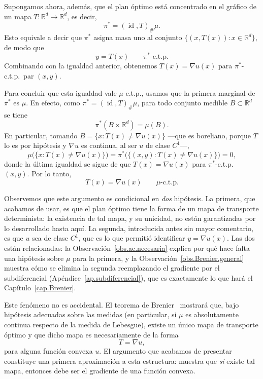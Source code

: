 \documentclass[12pt, a4paper]{amsbook}
\theoremstyle{remark}
\theoremstyle{definition}
\numberwithin{section}{chapter}
\numberwithin{subsection}{section}
\numberwithin{equation}{section}
\numberwithin{figure}{chapter}
\begin{document}
Supongamos ahora, además, que el plan óptimo está concentrado en el gráfico de un mapa $T\colon\mathbb{R}^d\to\mathbb{R}^d$, es decir,
\[
\pi^*=(\operatorname{id},T)_\#\mu.
\]
Esto equivale a decir que $\pi^*$ asigna masa uno al conjunto $\{(x,T(x)):x\in\mathbb{R}^d\}$, de modo que
\[
y=T(x)
\qquad
\pi^*\text{-c.t.p.}
\]
Combinando con la igualdad anterior, obtenemos $T(x)=\nabla u(x)$ para $\pi^*$-c.t.p.\ par $(x,y)$.

Para concluir que esta igualdad vale $\mu$-c.t.p., usamos que la primera marginal de $\pi^*$ es $\mu$. En efecto, como $\pi^*=(\operatorname{id},T)_\#\mu$, para todo conjunto medible $B\subset\mathbb{R}^d$ se tiene
\[
\pi^*(B\times\mathbb{R}^d)=\mu(B).
\]
En particular, tomando $B=\{x:T(x)\neq\nabla u(x)\}$ —que es boreliano,
porque $T$ lo es por hipótesis y $\nabla u$ es continua, al ser $u$ de clase
$C^1$—,
\[
\mu\bigl(\{x:T(x)\neq\nabla u(x)\}\bigr)
=
\pi^*\bigl(\{(x,y):T(x)\neq\nabla u(x)\}\bigr)
=0,
\]
donde la última igualdad se sigue de que $T(x)=\nabla u(x)$ para $\pi^*$-c.t.p.\ $(x,y)$. Por lo tanto,
\[
T(x)=\nabla u(x)
\qquad
\mu\text{-c.t.p.}
\]

Observemos que este argumento es condicional en \emph{dos} hipótesis. La
primera, que acabamos de usar, es que el plan óptimo tiene la forma de un
mapa de transporte determinista: la existencia de tal mapa, y su unicidad, no
están garantizadas por lo desarrollado hasta aquí. La segunda, introducida
antes sin mayor comentario, es que $u$ sea de clase $C^1$, que es lo que
permitió identificar $y=\nabla u(x)$. Las dos están relacionadas: la
Observación~\ref{obs.ac.necesaria} explica por qué hace falta una hipótesis
sobre $\mu$ para la primera, y la Observación~\ref{obs.Brenier.general}
muestra cómo se elimina la segunda reemplazando el gradiente por el
subdiferencial (Apéndice~\ref{ap.subdiferencial}), que es exactamente lo que hará
el Capítulo~\ref{cap.Brenier}.

Este fenómeno no es accidental. El teorema de Brenier~\cite{Brenier1991}
mostrará que, bajo hipótesis adecuadas sobre las medidas (en particular, si
$\mu$ es absolutamente continua respecto de la medida de Lebesgue), existe
un único mapa de transporte óptimo y que dicho mapa es necesariamente de la
forma
\[
T=\nabla u,
\]
para alguna función convexa $u$. El argumento que acabamos de presentar
constituye una primera aproximación a esta estructura: muestra que \emph{si}
existe tal mapa, entonces debe ser el gradiente de una función convexa.
\end{document}
